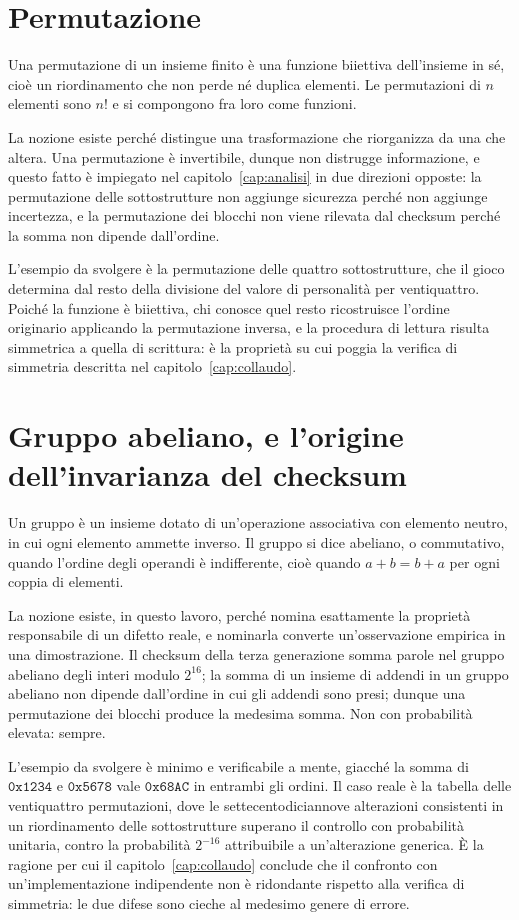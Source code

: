 \section{Permutazione}

Una permutazione di un insieme finito è una funzione biiettiva dell'insieme in sé, cioè un riordinamento che non perde né duplica elementi. Le permutazioni di $n$ elementi sono $n!$ e si compongono fra loro come funzioni.

La nozione esiste perché distingue una trasformazione che riorganizza da una che altera. Una permutazione è invertibile, dunque non distrugge informazione, e questo fatto è impiegato nel capitolo~\ref{cap:analisi} in due direzioni opposte: la permutazione delle sottostrutture non aggiunge sicurezza perché non aggiunge incertezza, e la permutazione dei blocchi non viene rilevata dal checksum perché la somma non dipende dall'ordine.

L'esempio da svolgere è la permutazione delle quattro sottostrutture, che il gioco determina dal resto della divisione del valore di personalità per ventiquattro. Poiché la funzione è biiettiva, chi conosce quel resto ricostruisce l'ordine originario applicando la permutazione inversa, e la procedura di lettura risulta simmetrica a quella di scrittura: è la proprietà su cui poggia la verifica di simmetria descritta nel capitolo~\ref{cap:collaudo}.

\section{Gruppo abeliano, e l'origine dell'invarianza del checksum}

Un gruppo è un insieme dotato di un'operazione associativa con elemento neutro, in cui ogni elemento ammette inverso. Il gruppo si dice abeliano, o commutativo, quando l'ordine degli operandi è indifferente, cioè quando $a + b = b + a$ per ogni coppia di elementi.

La nozione esiste, in questo lavoro, perché nomina esattamente la proprietà responsabile di un difetto reale, e nominarla converte un'osservazione empirica in una dimostrazione. Il checksum della terza generazione somma parole nel gruppo abeliano degli interi modulo $2^{16}$; la somma di un insieme di addendi in un gruppo abeliano non dipende dall'ordine in cui gli addendi sono presi; dunque una permutazione dei blocchi produce la medesima somma. Non con probabilità elevata: sempre.

L'esempio da svolgere è minimo e verificabile a mente, giacché la somma di $\mathtt{0x1234}$ e $\mathtt{0x5678}$ vale $\mathtt{0x68AC}$ in entrambi gli ordini. Il caso reale è la tabella delle ventiquattro permutazioni, dove le settecentodiciannove alterazioni consistenti in un riordinamento delle sottostrutture superano il controllo con probabilità unitaria, contro la probabilità $2^{-16}$ attribuibile a un'alterazione generica. È la ragione per cui il capitolo~\ref{cap:collaudo} conclude che il confronto con un'implementazione indipendente non è ridondante rispetto alla verifica di simmetria: le due difese sono cieche al medesimo genere di errore.


